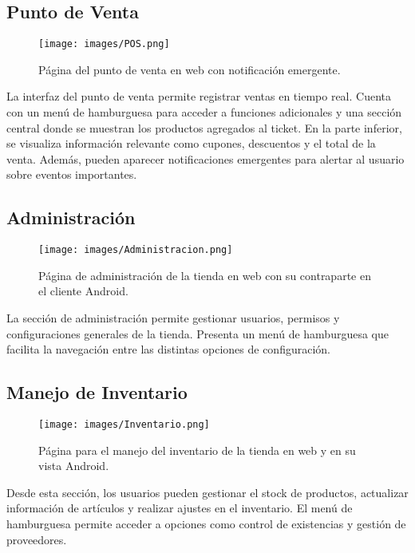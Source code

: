 \subsection{Punto de Venta}

\begin{figure}[H]
    \texttt{[image: images/POS.png]}
    \centering
    \caption{Página del punto de venta en web con notificación emergente.}
\end{figure}

La interfaz del punto de venta permite registrar ventas en tiempo real. Cuenta con un menú de hamburguesa para acceder
a funciones adicionales y una sección central donde se muestran los productos agregados al ticket.
En la parte inferior, se visualiza información relevante como cupones, descuentos y el total de la venta.
Además, pueden aparecer notificaciones emergentes para alertar al usuario sobre eventos importantes.

\subsection{Administración}

\begin{figure}[H]
    \texttt{[image: images/Administracion.png]}
    \centering
    \caption{Página de administración de la tienda en web con su contraparte en el cliente Android.}
\end{figure}

La sección de administración permite gestionar usuarios, permisos y configuraciones generales de la tienda.
Presenta un menú de hamburguesa que facilita la navegación entre las distintas opciones de configuración.

\subsection{Manejo de Inventario}

\begin{figure}[H]
    \texttt{[image: images/Inventario.png]}
    \centering
    \caption{Página para el manejo del inventario de la tienda en web y en su vista Android.}
\end{figure}

Desde esta sección, los usuarios pueden gestionar el stock de productos, actualizar información de artículos
y realizar ajustes en el inventario. El menú de hamburguesa permite acceder a opciones como control de existencias
y gestión de proveedores.

